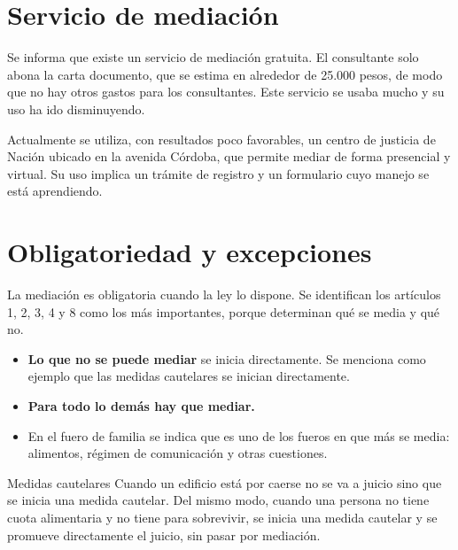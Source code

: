 \documentclass[12pt,oneside]{book}
\begin{document}
\section{Servicio de mediación}

Se informa que existe un servicio de mediación gratuita. El consultante solo abona la carta documento, que se estima en alrededor de 25.000 pesos, de modo que no hay otros gastos para los consultantes. Este servicio se usaba mucho y su uso ha ido disminuyendo.

Actualmente se utiliza, con resultados poco favorables, un centro de justicia de Nación ubicado en la avenida Córdoba, que permite mediar de forma presencial y virtual. Su uso implica un trámite de registro y un formulario cuyo manejo se está aprendiendo.


\section{Obligatoriedad y excepciones}

La mediación es obligatoria cuando la ley lo dispone. Se identifican los artículos 1, 2, 3, 4 y 8 como los más importantes, porque determinan qué se media y qué no.


\begin{itemize}
    \item \textbf{Lo que no se puede mediar} se inicia directamente. Se menciona como ejemplo que las medidas cautelares se inician directamente.
    \item \textbf{Para todo lo demás hay que mediar.}
    \item En el fuero de familia se indica que es uno de los fueros en que más se media: alimentos, régimen de comunicación y otras cuestiones.
\end{itemize}


\begin{example}{Medidas cautelares}
Cuando un edificio está por caerse no se va a juicio sino que se inicia una medida cautelar. Del mismo modo, cuando una persona no tiene cuota alimentaria y no tiene para sobrevivir, se inicia una medida cautelar y se promueve directamente el juicio, sin pasar por mediación.
\end{example}
\end{document}
